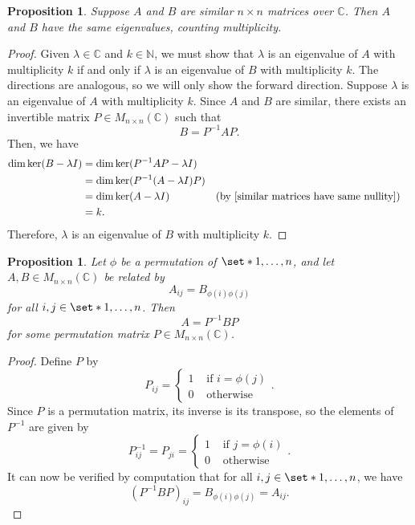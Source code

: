 \documentclass[12pt]{article}
\newtheorem{prop}[thm]{Proposition}
\theoremstyle{definition}
\newcommand{\N}{\mathbb N}
\newcommand{\C}{\mathbb C}
\begin{document}
\begin{prop}\label{similar matrices have same spectrum}
Suppose $A$ and $B$ are similar $n \times n$ matrices over $\C$. Then $A$ and $B$ have the same eigenvalues, counting multiplicity.
\end{prop}
\begin{proof}
Given $\lambda \in \C$ and $k \in \N$, we must show that $\lambda$ is an eigenvalue of $A$ with multiplicity $k$ if and only if $\lambda$ is an eigenvalue of $B$ with multiplicity $k$. The directions are analogous, so we will only show the forward direction. Suppose $\lambda$ is an eigenvalue of $A$ with multiplicity $k$. Since $A$ and $B$ are similar, there exists an invertible matrix $P \in M_{n \times n}(\C)$ such that 
$$B = P^{-1} A P.$$
Then, we have
\begin{align*}
\dim \ker (B - \lambda I) 
&= \dim \ker (P^{-1} A P - \lambda I) \\
&= \dim \ker (P^{-1} (A - \lambda I) P) \\
&= \dim \ker (A - \lambda I) &&\text{(by \cref{similar matrices have same nullity})} \\
&= k.
\end{align*}
Therefore, $\lambda$ is an eigenvalue of $B$ with multiplicity $k$.
\end{proof}

\begin{prop}\label{permuted matrices are similar}
Let $\phi$ be a permutation of $\set*{1, \dots, n}$, and let $A, B \in M_{n \times n}(\C)$ be related by 
$$A_{ij} = B_{\phi(i)\phi(j)}$$
for all $i, j \in \set*{1, \dots, n}$. Then
$$A=P^{-1}BP$$
for some permutation matrix $P \in M_{n \times n}(\C)$.
\end{prop}
\begin{proof}
Define $P$ by 
$$
P_{ij} = 
\begin{cases}
1 &\mbox{ if } i=\phi(j) \\
0 &\mbox{ otherwise}
\end{cases}.
$$
Since $P$ is a permutation matrix, its inverse is its transpose, so the elements of $P^{-1}$ are given by
$$
P^{-1}_{ij} = 
P_{ji} =
\begin{cases}
1 &\mbox{ if } j=\phi(i) \\
0 &\mbox{ otherwise}
\end{cases}.
$$
It can now be verified by computation that for all $i, j \in \set*{1, \dots, n}$, we have
$$\left( P^{-1}BP \right)_{ij} = B_{\phi(i)\phi(j)} = A_{ij}.$$
\end{proof}
\end{document}
